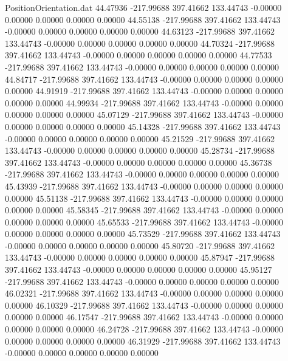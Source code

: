 \begin{filecontents}{PositionOrientation.dat}
  44.47936 -217.99688  397.41662   133.44743   -0.00000    0.00000    0.00000    0.00000    0.00000
  44.55138 -217.99688  397.41662   133.44743   -0.00000    0.00000    0.00000    0.00000    0.00000
  44.63123 -217.99688  397.41662   133.44743   -0.00000    0.00000    0.00000    0.00000    0.00000
  44.70324 -217.99688  397.41662   133.44743   -0.00000    0.00000    0.00000    0.00000    0.00000
  44.77533 -217.99688  397.41662   133.44743   -0.00000    0.00000    0.00000    0.00000    0.00000
  44.84717 -217.99688  397.41662   133.44743   -0.00000    0.00000    0.00000    0.00000    0.00000
  44.91919 -217.99688  397.41662   133.44743   -0.00000    0.00000    0.00000    0.00000    0.00000
  44.99934 -217.99688  397.41662   133.44743   -0.00000    0.00000    0.00000    0.00000    0.00000
  45.07129 -217.99688  397.41662   133.44743   -0.00000    0.00000    0.00000    0.00000    0.00000
  45.14328 -217.99688  397.41662   133.44743   -0.00000    0.00000    0.00000    0.00000    0.00000
  45.21529 -217.99688  397.41662   133.44743   -0.00000    0.00000    0.00000    0.00000    0.00000
  45.28734 -217.99688  397.41662   133.44743   -0.00000    0.00000    0.00000    0.00000    0.00000
  45.36738 -217.99688  397.41662   133.44743   -0.00000    0.00000    0.00000    0.00000    0.00000
  45.43939 -217.99688  397.41662   133.44743   -0.00000    0.00000    0.00000    0.00000    0.00000
  45.51138 -217.99688  397.41662   133.44743   -0.00000    0.00000    0.00000    0.00000    0.00000
  45.58345 -217.99688  397.41662   133.44743   -0.00000    0.00000    0.00000    0.00000    0.00000
  45.65533 -217.99688  397.41662   133.44743   -0.00000    0.00000    0.00000    0.00000    0.00000
  45.73529 -217.99688  397.41662   133.44743   -0.00000    0.00000    0.00000    0.00000    0.00000
  45.80720 -217.99688  397.41662   133.44743   -0.00000    0.00000    0.00000    0.00000    0.00000
  45.87947 -217.99688  397.41662   133.44743   -0.00000    0.00000    0.00000    0.00000    0.00000
  45.95127 -217.99688  397.41662   133.44743   -0.00000    0.00000    0.00000    0.00000    0.00000
  46.02321 -217.99688  397.41662   133.44743   -0.00000    0.00000    0.00000    0.00000    0.00000
  46.10329 -217.99688  397.41662   133.44743   -0.00000    0.00000    0.00000    0.00000    0.00000
  46.17547 -217.99688  397.41662   133.44743   -0.00000    0.00000    0.00000    0.00000    0.00000
  46.24728 -217.99688  397.41662   133.44743   -0.00000    0.00000    0.00000    0.00000    0.00000
  46.31929 -217.99688  397.41662   133.44743   -0.00000    0.00000    0.00000    0.00000    0.00000

\end{filecontents}

